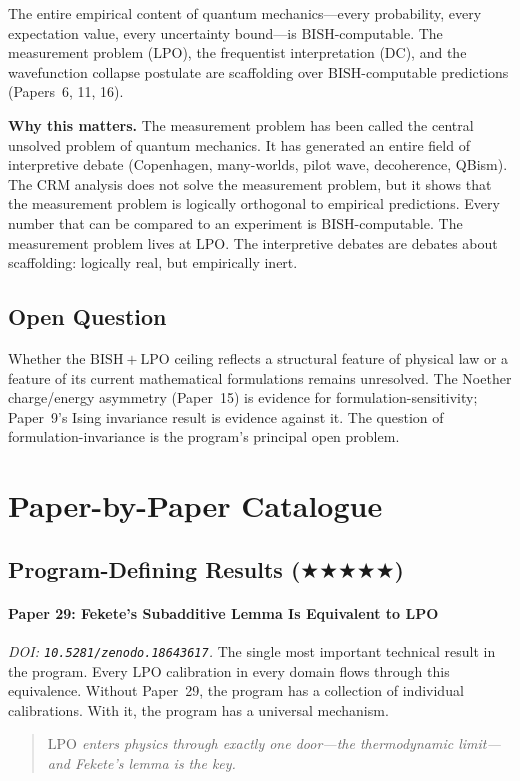 \documentclass[11pt,a4paper]{report}
\theoremstyle{plain}
\theoremstyle{definition}
\theoremstyle{remark}
\newcommand{\BISH}{\mathrm{BISH}}
\newcommand{\LPO}{\mathrm{LPO}}
\newcommand{\DC}{\mathrm{DC}}
\newcommand{\FiveStar}{$\bigstar\bigstar\bigstar\bigstar\bigstar$}
\begin{document}
The entire empirical content of quantum mechanics---every probability, every expectation value, every uncertainty bound---is $\BISH$-computable.  The measurement problem ($\LPO$), the frequentist interpretation ($\DC$), and the wavefunction collapse postulate are scaffolding over $\BISH$-computable predictions (Papers~6, 11, 16).

\medskip\noindent
\textbf{Why this matters.}\quad
The measurement problem has been called the central unsolved problem of quantum mechanics.  It has generated an entire field of interpretive debate (Copenhagen, many-worlds, pilot wave, decoherence, QBism).  The CRM analysis does not solve the measurement problem, but it shows that the measurement problem is logically orthogonal to empirical predictions.  Every number that can be compared to an experiment is $\BISH$-computable.  The measurement problem lives at $\LPO$.  The interpretive debates are debates about scaffolding: logically real, but empirically inert.

\subsection*{Open Question}

Whether the $\BISH+\LPO$ ceiling reflects a structural feature of physical law or a feature of its current mathematical formulations remains unresolved.  The Noether charge/energy asymmetry (Paper~15) is evidence for formulation-sensitivity; Paper~9's Ising invariance result is evidence against it.  The question of formulation-invariance is the program's principal open problem.

\section{Paper-by-Paper Catalogue}

\subsection{Program-Defining Results {\normalfont(\FiveStar)}}

\paragraph{Paper 29: Fekete's Subadditive Lemma Is Equivalent to LPO}
\emph{DOI: \texttt{10.5281/zenodo.18643617}.}\quad
The single most important technical result in the program.  Every $\LPO$ calibration in every domain flows through this equivalence.  Without Paper~29, the program has a collection of individual calibrations.  With it, the program has a universal mechanism.
\begin{quote}\itshape
$\LPO$ enters physics through exactly one door---the thermodynamic limit---and Fekete's lemma is the key.
\end{quote}
\end{document}
